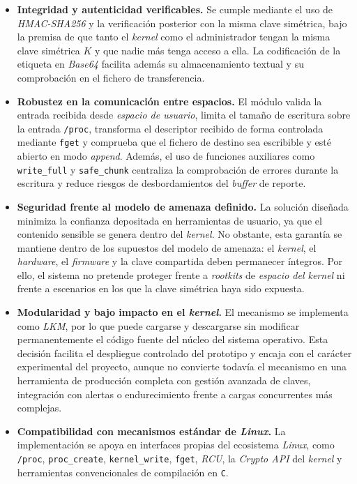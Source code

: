 \begin{itemize}
    \item \textbf{Integridad y autenticidad verificables.} Se cumple mediante el uso de \textit{HMAC-SHA256} y la verificación posterior con la misma clave simétrica, bajo la premisa de que tanto el \textit{kernel} como el administrador tengan la misma clave simétrica \(K\) y que nadie más tenga acceso a ella. La codificación de la etiqueta en \textit{Base64} facilita además su almacenamiento textual y su comprobación en el fichero de transferencia.
    
    \item \textbf{Robustez en la comunicación entre espacios.} El módulo valida la entrada recibida desde \textit{espacio de usuario}, limita el tamaño de escritura sobre la entrada \texttt{/proc}, transforma el descriptor recibido de forma controlada mediante \verb|fget| y comprueba que el fichero de destino sea escribible y esté abierto en modo \textit{append}. Además, el uso de funciones auxiliares como \verb|write_full| y \verb|safe_chunk| centraliza la comprobación de errores durante la escritura y reduce riesgos de desbordamientos del \textit{buffer} de reporte.
    
    \item \textbf{Seguridad frente al modelo de amenaza definido.} La solución diseñada minimiza la confianza depositada en herramientas de usuario, ya que el contenido sensible se genera dentro del \textit{kernel}. No obstante, esta garantía se mantiene dentro de los supuestos del modelo de amenaza: el \textit{kernel}, el \textit{hardware}, el \textit{firmware} y la clave compartida deben permanecer íntegros. Por ello, el sistema no pretende proteger frente a \textit{rootkits} de \textit{espacio del kernel} ni frente a escenarios en los que la clave simétrica haya sido expuesta.
    
    \item \textbf{Modularidad y bajo impacto en el \textit{kernel}.} El mecanismo se implementa como \textit{LKM}, por lo que puede cargarse y descargarse sin modificar permanentemente el código fuente del núcleo del sistema operativo. Esta decisión facilita el despliegue controlado del prototipo y encaja con el carácter experimental del proyecto, aunque no convierte todavía el mecanismo en una herramienta de producción completa con gestión avanzada de claves, integración con alertas o endurecimiento frente a cargas concurrentes más complejas.
    
    \item \textbf{Compatibilidad con mecanismos estándar de \textit{Linux}.} La implementación se apoya en interfaces propias del ecosistema \textit{Linux}, como \texttt{/proc}, \verb|proc_create|, \verb|kernel_write|, \verb|fget|, \textit{RCU}, la \textit{Crypto API} del \textit{kernel} y herramientas convencionales de compilación en \texttt{C}.
    

\end{itemize}
